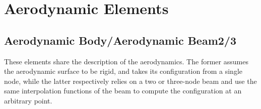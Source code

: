 %
%
%
%
%
%
%
%

\section{Aerodynamic Elements}
\label{sec:EL:AERO}


\subsection{Aerodynamic Body/Aerodynamic Beam2/3}
\label{sec:EL:AERO:BODY-BEAM23}
These elements share the description of the aerodynamics.
The former assumes the aerodynamic surface to be rigid,
and takes its configuration from a single node, while the latter
respectively relies on a two or three-node beam
and use the same interpolation functions of the beam to compute
the configuration at an arbitrary point.

